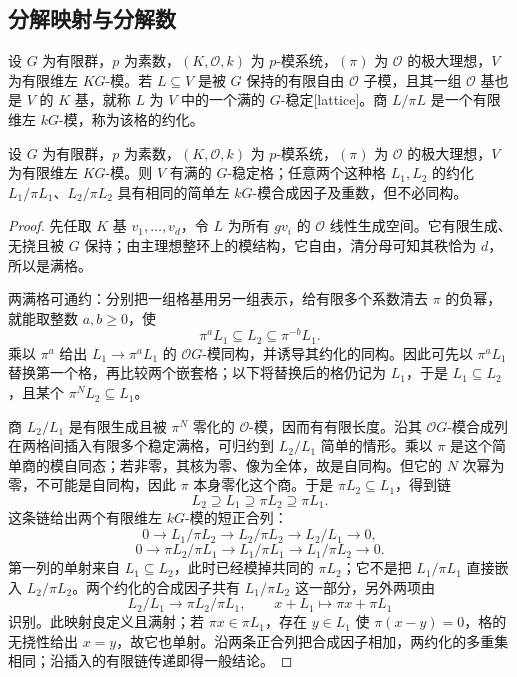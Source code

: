 \subsection{分解映射与分解数}
\label{b5:subsec:0803:03}

\begin{definition}\label{b5:def:stable-integral-lattice}
	设 \(G\) 为有限群，\(p\) 为素数，\((K,\mathcal O,k)\) 为 \(p\)-模系统，\((\pi)\) 为 \(\mathcal O\) 的极大理想，\(V\) 为有限维左 \(KG\)-模。若 \(L\subseteq V\) 是被 \(G\) 保持的有限自由 \(\mathcal O\) 子模，且其一组 \(\mathcal O\) 基也是 \(V\) 的 \(K\) 基，就称 \(L\) 为 \(V\) 中的一个满的 \(G\)-稳定[lattice]。商 \(L/\pi L\) 是一个有限维左 \(kG\)-模，称为该格的约化。
\end{definition}
\begin{theorem}\label{b5:thm:lattice-reduction-independence}
	设 \(G\) 为有限群，\(p\) 为素数，\((K,\mathcal O,k)\) 为 \(p\)-模系统，\((\pi)\) 为 \(\mathcal O\) 的极大理想，\(V\) 为有限维左 \(KG\)-模。则 \(V\) 有满的 \(G\)-稳定格；任意两个这种格 \(L_1,L_2\) 的约化 \(L_1/\pi L_1\)、\(L_2/\pi L_2\) 具有相同的简单左 \(kG\)-模合成因子及重数，但不必同构。
\end{theorem}
\begin{proof}
	先任取 \(K\) 基 \(v_1,\ldots,v_d\)，令 \(L\) 为所有 \(gv_i\) 的 \(\mathcal O\) 线性生成空间。它有限生成、无挠且被 \(G\) 保持；由主理想整环上的模结构，它自由，清分母可知其秩恰为 \(d\)，所以是满格。

	两满格可通约：分别把一组格基用另一组表示，给有限多个系数清去 \(\pi\) 的负幂，就能取整数 \(a,b\ge0\)，使
	\[
		\pi^aL_1\subseteq L_2\subseteq\pi^{-b}L_1.
	\]
	乘以 \(\pi^a\) 给出 \(L_1\to\pi^aL_1\) 的 \(\mathcal O G\)-模同构，并诱导其约化的同构。因此可先以 \(\pi^aL_1\) 替换第一个格，再比较两个嵌套格；以下将替换后的格仍记为 \(L_1\)，于是 \(L_1\subseteq L_2\)，且某个 \(\pi^N L_2\subseteq L_1\)。

	商 \(L_2/L_1\) 是有限生成且被 \(\pi^N\) 零化的 \(\mathcal O\)-模，因而有有限长度。沿其 \(\mathcal O G\)-模合成列在两格间插入有限多个稳定满格，可归约到 \(L_2/L_1\) 简单的情形。乘以 \(\pi\) 是这个简单商的模自同态；若非零，其核为零、像为全体，故是自同构。但它的 \(N\) 次幂为零，不可能是自同构，因此 \(\pi\) 本身零化这个商。于是 \(\pi L_2\subseteq L_1\)，得到链
	\[
		L_2\supseteq L_1\supseteq\pi L_2\supseteq\pi L_1.
	\]
	这条链给出两个有限维左 \(kG\)-模的短正合列：
	\[
		0\longrightarrow L_1/\pi L_2 \longrightarrow L_2/\pi L_2 \longrightarrow L_2/L_1\longrightarrow0,
	\]
	\[
		0\longrightarrow\pi L_2/\pi L_1 \longrightarrow L_1/\pi L_1 \longrightarrow L_1/\pi L_2\longrightarrow0.
	\]
	第一列的单射来自 \(L_1\subseteq L_2\)，此时已经模掉共同的 \(\pi L_2\)；它不是把 \(L_1/\pi L_1\) 直接嵌入 \(L_2/\pi L_2\)。两个约化的合成因子共有 \(L_1/\pi L_2\) 这一部分，另外两项由
	\[
		L_2/L_1\longrightarrow\pi L_2/\pi L_1,\qquad x+L_1\longmapsto\pi x+\pi L_1
	\]
	识别。此映射良定义且满射；若 \(\pi x\in\pi L_1\)，存在 \(y\in L_1\) 使 \(\pi(x-y)=0\)，格的无挠性给出 \(x=y\)，故它也单射。沿两条正合列把合成因子相加，两约化的多重集相同；沿插入的有限链传递即得一般结论。
\end{proof}
